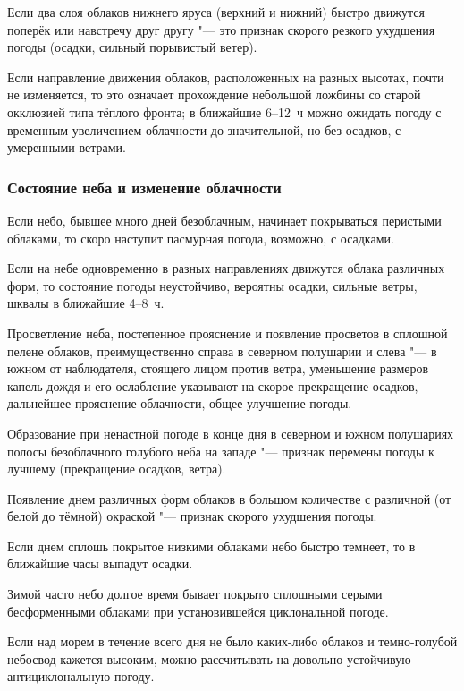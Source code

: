  Если два слоя облаков нижнего яруса (верхний и нижний) быстро
движутся поперёк или навстречу друг другу "--- это признак скорого резкого
ухудшения погоды (осадки, сильный порывистый ветер).

 Если направление движения облаков, расположенных на разных
высотах, почти не изменяется, то это означает прохождение небольшой
ложбины со старой окклюзией типа тёплого фронта; в ближайшие 6--12~ч
можно ожидать погоду с временным увеличением облачности до
значительной, но без осадков, с умеренными ветрами.

\subsubsection{Состояние неба и изменение облачности}

 Если небо, бывшее много дней безоблачным, начинает покрываться
перистыми облаками, то скоро наступит пасмурная погода, возможно, с
осадками.

 Если на небе одновременно в разных направлениях движутся облака
различных форм, то состояние погоды неустойчиво, вероятны осадки,
сильные ветры, шквалы в ближайшие 4--8~ч.

 Просветление неба, постепенное прояснение и появление просветов
в сплошной пелене облаков, преимущественно справа в северном полушарии
и слева "--- в южном от наблюдателя, стоящего лицом против ветра,
уменьшение размеров капель дождя и его ослабление указывают на скорое
прекращение осадков, дальнейшее прояснение облачности, общее улучшение
погоды.

 Образование при ненастной погоде в конце дня в северном и южном
полушариях полосы безоблачного голубого неба на западе "--- признак
перемены погоды к лучшему (прекращение осадков, ветра).

 Появление днем различных форм облаков в большом количестве с
различной (от белой до тёмной) окраской "--- признак скорого ухудшения
погоды.

 Если днем сплошь покрытое низкими облаками небо быстро темнеет,
то в ближайшие часы выпадут осадки.

 Зимой часто небо долгое время бывает покрыто сплошными серыми
бесформенными облаками при установившейся циклональной погоде.

 Если над морем в течение всего дня не было каких-либо облаков и
темно-голубой небосвод кажется высоким, можно рассчитывать на довольно
устойчивую антициклональную погоду.

